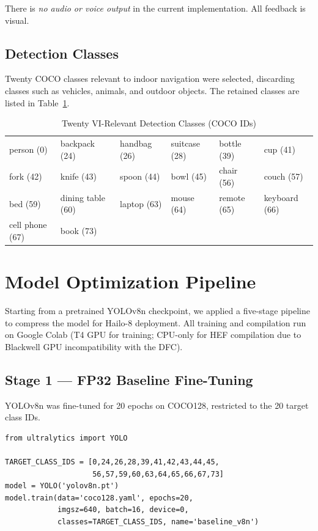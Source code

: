 \documentclass[journal, onecolumn]{IEEEtran}
\begin{document}
There is \emph{no audio or voice output} in the current implementation. All feedback is visual.

\subsection{Detection Classes}

Twenty COCO classes relevant to indoor navigation were selected, discarding classes such as vehicles, animals, and outdoor objects. The retained classes are listed in Table~\ref{tab:classes}.

\begin{table}[H]
\centering
\caption{Twenty VI-Relevant Detection Classes (COCO IDs)}
\label{tab:classes}
\begin{tabular}{llllll}
\toprule
person (0) & backpack (24) & handbag (26) & suitcase (28) & bottle (39) & cup (41) \\
fork (42)  & knife (43)    & spoon (44)   & bowl (45)     & chair (56)  & couch (57) \\
bed (59)   & dining table (60) & laptop (63) & mouse (64) & remote (65) & keyboard (66) \\
cell phone (67) & book (73) & & & & \\
\bottomrule
\end{tabular}
\end{table}

\section{Model Optimization Pipeline}
\label{sec:opt}

Starting from a pretrained YOLOv8n checkpoint, we applied a five-stage pipeline to compress the model for Hailo-8 deployment. All training and compilation run on Google Colab (T4 GPU for training; CPU-only for HEF compilation due to Blackwell GPU incompatibility with the DFC).

\subsection{Stage 1 — FP32 Baseline Fine-Tuning}

YOLOv8n was fine-tuned for 20 epochs on COCO128, restricted to the 20 target class IDs.

\begin{lstlisting}[caption={Baseline fine-tuning on Colab T4},label=lst:train]
from ultralytics import YOLO

TARGET_CLASS_IDS = [0,24,26,28,39,41,42,43,44,45,
                    56,57,59,60,63,64,65,66,67,73]
model = YOLO('yolov8n.pt')
model.train(data='coco128.yaml', epochs=20,
            imgsz=640, batch=16, device=0,
            classes=TARGET_CLASS_IDS, name='baseline_v8n')
\end{lstlisting}
\end{document}
